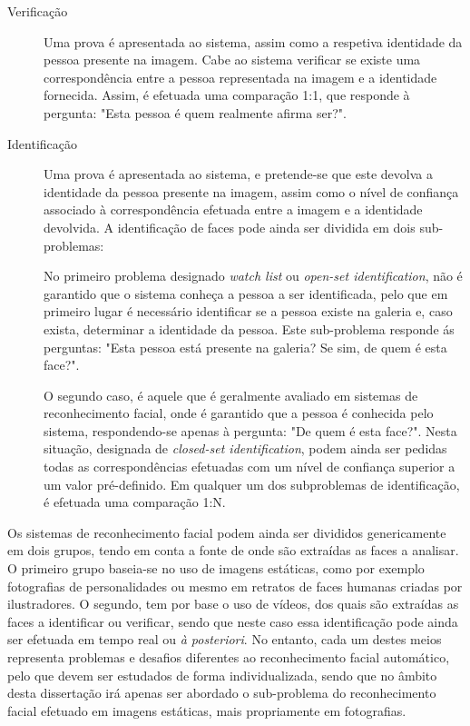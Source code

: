 \begin{description}
\item[Verificação] Uma prova é apresentada ao sistema, assim como a respetiva identidade da pessoa presente na imagem. Cabe ao sistema verificar se existe uma correspondência entre a pessoa representada na imagem e a identidade fornecida. Assim, é efetuada uma comparação 1:1, que responde à pergunta: "Esta pessoa é quem realmente afirma ser?".

\item[Identificação] Uma prova é apresentada ao sistema, e pretende-se que este devolva a identidade da pessoa presente na imagem, assim como o nível de confiança associado à correspondência efetuada entre a imagem e a identidade devolvida. A identificação de faces pode ainda ser dividida em dois sub-problemas: 

No primeiro problema designado \textit{watch list} ou \textit{open-set identification}\citep{Chellappa2010}, não é garantido que o sistema conheça a pessoa a ser identificada, pelo que em primeiro lugar é necessário identificar se a pessoa existe na galeria e, caso exista, determinar a identidade da pessoa. Este sub-problema responde ás perguntas: "Esta pessoa está presente na galeria? Se sim, de quem é esta face?". 

O segundo caso, é aquele que é geralmente avaliado em sistemas de reconhecimento facial, onde é garantido que a pessoa é conhecida pelo sistema, respondendo-se apenas à pergunta: "De quem é esta face?". Nesta situação, designada de \textit{closed-set identification}, podem ainda ser pedidas todas as correspondências efetuadas com um nível de confiança superior a um valor pré-definido. 
Em qualquer um dos subproblemas de identificação, é efetuada uma comparação 1:N.
\end{description}

Os sistemas de reconhecimento facial podem ainda ser divididos genericamente em dois grupos, tendo em conta a fonte de onde são extraídas as faces a analisar. O primeiro grupo baseia-se no uso de imagens estáticas, como por exemplo fotografias de personalidades ou mesmo em retratos de faces humanas criadas por ilustradores. O segundo, tem por base o uso de vídeos, dos quais são extraídas as faces a identificar ou verificar, sendo que neste caso essa identificação pode ainda ser efetuada em tempo real ou \textit{à posteriori}. No entanto, cada um destes meios representa problemas e desafios diferentes ao reconhecimento facial automático, pelo que devem ser estudados de forma individualizada, sendo que no âmbito desta dissertação irá apenas ser abordado o sub-problema do reconhecimento facial efetuado em imagens estáticas, mais propriamente em fotografias.

